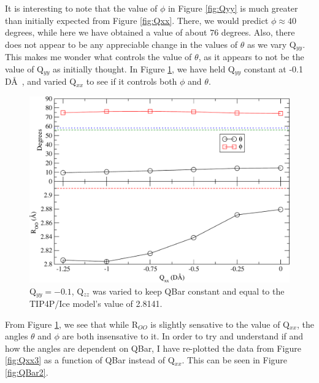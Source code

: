 It is interesting to note that the value of $\phi$ in Figure \ref{fig:Qyy} is 
much greater than initially expected from Figure \ref{fig:Qxx}. There, we would
predict $\phi \approx 40$ degrees, while here we have obtained a value of about
$76$ degrees. Also, there does not appear to be any appreciable change in the
values of $\theta$ as we vary Q$_{yy}$. This makes me wonder what controls
the value of $\theta$, as it appears to not be the value of Q$_{yy}$ as 
initially thought. In Figure \ref{fig:Qyy2}, we have held Q$_{yy}$ constant
at -0.1 D\AA~, and varied Q$_{xx}$ to see if it controls both $\phi$ and
$\theta$.

\begin{figure}[h!]
\includegraphics[width=\linewidth]{Figures/Test20_plot.pdf}
\caption{\label{fig:Qyy2} Q$_{yy} = -0.1$, Q$_{zz}$ was varied to keep QBar constant and equal to the TIP4P/Ice model's value of 2.8141.}
\end{figure}

From Figure \ref{fig:Qyy2}, we see that while R$_{OO}$ is slightly sensative
to the value of Q$_{xx}$, the angles $\theta$ and $\phi$ are both insensative
to it. In order to try and understand if and how the angles are dependent
on QBar, I have re-plotted the data from Figure \ref{fig:Qxx3} as a function
of QBar instead of Q$_{xx}$. This can be seen in Figure \ref{fig:QBar2}.

